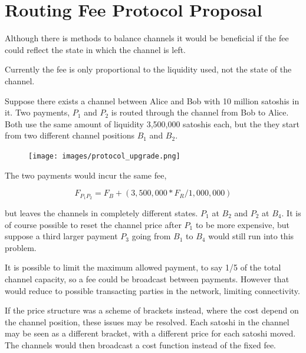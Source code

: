 \chapter*{Routing Fee Protocol Proposal}

Although there is methods to balance channels it would be beneficial if the fee could reflect the state in which the channel is left.

Currently the fee is only proportional to the liquidity used, not the state of the channel.

Suppose there exists a channel between Alice and Bob with 10 million satoshis in it. 
Two payments, $P_{1}$ and $P_{2}$ is routed through the channel from Bob to Alice.
Both use the same amount of liquidity 3,500,000 satoshis each, but the they start from
two different channel positions $B_{1}$ and $B_2$.

\begin{figure}[!htb]
	\hspace*{-0.7cm} 
	\centering
	\texttt{[image: images/protocol\_upgrade.png]}

	\label{fig:xt_nodes}
	\hspace*{2mm} 	
\end{figure}

The two payments would incur the same fee, 

\[ F_{P_1 P_2} = F_B + (3,500,000 * F_R / 1,000,000) \]

but leaves the channels in completely different states. $P_1$ at $B_2$ and $P_2$ at $B_4$. It is of course possible to reset the channel price after $P_1$ to
be more expensive, but suppose a third larger payment $P_3$ going from $B_1$ to $B_4$ would still run into this problem.

It is possible to limit the maximum allowed payment, to say 1/5 of the total channel capacity, so a fee could be broadcast between payments. However 
that would reduce to possible transacting parties in the network, limiting connectivity.

If the price structure was a scheme of brackets instead, where the cost depend on the channel position, these issues may be resolved. 
Each satoshi in the channel may be seen as a different bracket, with a different price for each satoshi moved. The channels would then broadcast a cost function instead of the fixed fee.

